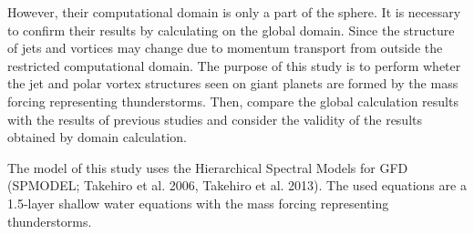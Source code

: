 \documentclass[a4j,12pt,openbib,oneside]{jreport}
\begin{document}
However, their computational domain is only a part of the sphere.
It is necessary to confirm their results by calculating on the global domain.
Since the structure of jets and vortices may change due to momentum transport from 
outside the restricted computational domain.
%
The purpose of this study is to perform 
wheter the jet and polar vortex structures seen on giant planets are
formed by the mass forcing representing thunderstorms.
%
Then, compare the global calculation results with the results of previous studies 
and consider the validity of the results obtained by domain calculation.

The model of this study uses the Hierarchical Spectral Models for GFD (SPMODEL; Takehiro et al. 2006, Takehiro et al. 2013).
%
The used equations are a 1.5-layer shallow water equations 
with the mass forcing representing thunderstorms.
%
\end{document}
